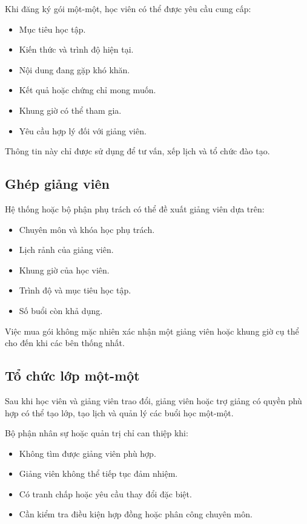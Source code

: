 \documentclass[12pt,a4paper]{article}
\begin{document}
Khi đăng ký gói một-một, học viên có thể được yêu cầu cung cấp:

\begin{itemize}
    \item Mục tiêu học tập.
    \item Kiến thức và trình độ hiện tại.
    \item Nội dung đang gặp khó khăn.
    \item Kết quả hoặc chứng chỉ mong muốn.
    \item Khung giờ có thể tham gia.
    \item Yêu cầu hợp lý đối với giảng viên.
\end{itemize}

Thông tin này chỉ được sử dụng để tư vấn, xếp lịch và tổ chức đào tạo.

\subsection{Ghép giảng viên}

Hệ thống hoặc bộ phận phụ trách có thể đề xuất giảng viên dựa trên:

\begin{itemize}
    \item Chuyên môn và khóa học phụ trách.
    \item Lịch rảnh của giảng viên.
    \item Khung giờ của học viên.
    \item Trình độ và mục tiêu học tập.
    \item Số buổi còn khả dụng.
\end{itemize}

Việc mua gói không mặc nhiên xác nhận một giảng viên hoặc khung giờ cụ thể
cho đến khi các bên thống nhất.

\subsection{Tổ chức lớp một-một}

Sau khi học viên và giảng viên trao đổi, giảng viên hoặc trợ giảng có quyền phù hợp
có thể tạo lớp, tạo lịch và quản lý các buổi học một-một.

Bộ phận nhân sự hoặc quản trị chỉ can thiệp khi:

\begin{itemize}
    \item Không tìm được giảng viên phù hợp.
    \item Giảng viên không thể tiếp tục đảm nhiệm.
    \item Có tranh chấp hoặc yêu cầu thay đổi đặc biệt.
    \item Cần kiểm tra điều kiện hợp đồng hoặc phân công chuyên môn.
\end{itemize}
\end{document}
